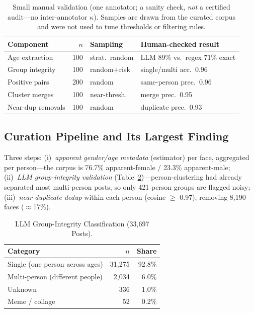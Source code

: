 \documentclass[journal]{IEEEtran}
\begin{document}
\begin{table}[!t]
\renewcommand{\arraystretch}{1.15}
\caption{Small manual validation (one annotator; a sanity check, \emph{not} a certified audit---no inter-annotator $\kappa$). Samples are drawn from the curated corpus and were not used to tune thresholds or filtering rules.}
\label{tab:humanval}
\centering
\footnotesize
\setlength{\tabcolsep}{3.5pt}%
\begin{tabular}{@{}lrll@{}}
\toprule
Component & $n$ & Sampling & Human-checked result \\
\midrule
Age extraction & 100 & strat.\ random & LLM 89\% vs.\ regex 71\% exact \\
Group integrity & 100 & random$+$risk & single/multi acc.\ 0.96 \\
Positive pairs & 200 & random & same-person prec.\ 0.96 \\
Cluster merges & 100 & near-thresh. & merge prec.\ 0.95 \\
Near-dup removals & 100 & random & duplicate prec.\ 0.93 \\
\bottomrule
\end{tabular}
\end{table}

\subsection{Curation Pipeline and Its Largest Finding}\label{sec:data-curation}
Three steps: (i)~\emph{apparent gender/age metadata} (estimator) per face, aggregated per person---the corpus is 76.7\% apparent-female / 23.3\% apparent-male; (ii)~\emph{LLM group-integrity validation} (Table~\ref{tab:integrity})---person-clustering had already separated most multi-person posts, so only 421 person-groups are flagged noisy; (iii)~\emph{near-duplicate dedup} within each person (cosine $\geq$ 0.97), removing 8{,}190 faces ($\approx$17\%).

\begin{table}[!t]
\renewcommand{\arraystretch}{1.2}
\caption{LLM Group-Integrity Classification (33{,}697 Posts).}
\label{tab:integrity}
\centering
\footnotesize
\begin{tabular}{@{}lrr@{}}
\toprule
Category & $n$ & Share \\
\midrule
Single (one person across ages) & 31{,}275 & 92.8\% \\
Multi-person (different people) & 2{,}034 & 6.0\% \\
Unknown & 336 & 1.0\% \\
Meme / collage & 52 & 0.2\% \\
\bottomrule
\end{tabular}
\end{table}
\end{document}
